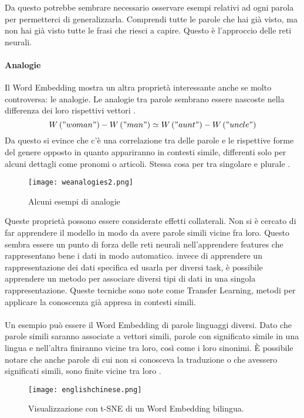 Da questo potrebbe sembrare necessario osservare esempi relativi ad ogni parola per permetterci di generalizzarla. Comprendi tutte le parole che hai già visto, ma non hai già visto tutte le frasi che riesci a capire. Questo è l’approccio delle reti neurali.

\paragraph{Analogie}Il Word Embedding mostra un altra proprietà interessante anche se molto controversa: le analogie. Le analogie tra parole sembrano essere nascoste nella differenza dei loro rispettivi vettori \cite{Mikolov13}. 
\begin{equation}
  W\left ( "woman" \right ) -  W\left ( "man" \right ) \simeq W\left ( "aunt" \right ) -  W\left ( "uncle" \right )
\end{equation}
Da questo si evince che c’è una correlazione tra delle parole e le rispettive forme del genere opposto in quanto appariranno in contesti simile, differenti solo per alcuni dettagli come pronomi o articoli. Stessa cosa per tra singolare e plurale \cite{Mikolov13}.
\begin{figure}[htb]
	\centering
	\texttt{[image: weanalogies2.png]}
	\caption{Alcuni esempi di analogie}
	\label{analogies}
\end{figure}
Queste proprietà possono essere considerate effetti collaterali. Non si è cercato di far apprendere il modello in modo da avere parole simili vicine fra loro. Questo sembra essere un punto di forza delle reti neurali nell’apprendere features che rappresentano bene i dati in modo automatico. invece di apprendere un rappresentazione dei dati specifica ed usarla per diversi task, è possibile apprendere un metodo per associare diversi tipi di dati in una singola rappresentazione. Queste tecniche sono note come Transfer Learning, metodi per applicare la conoscenza già appresa in contesti simili.
\\\\
Un esempio può essere il Word Embedding di parole linguaggi diversi. Dato che parole simili saranno associate a vettori simili, parole con significato simile in una lingua e nell’altra finiranno vicine tra loro, così come i loro sinonimi. È possibile notare che anche parole di cui non si conosceva la traduzione o che avessero significati simili, sono finite vicine tra loro \cite{Zou13}.
\begin{figure}[htb]
	\centering
	\texttt{[image: englishchinese.png]}
	\caption{Visualizzazione con t-SNE di un Word Embedding bilingua. }
	\label{englishchinese}
\end{figure}


